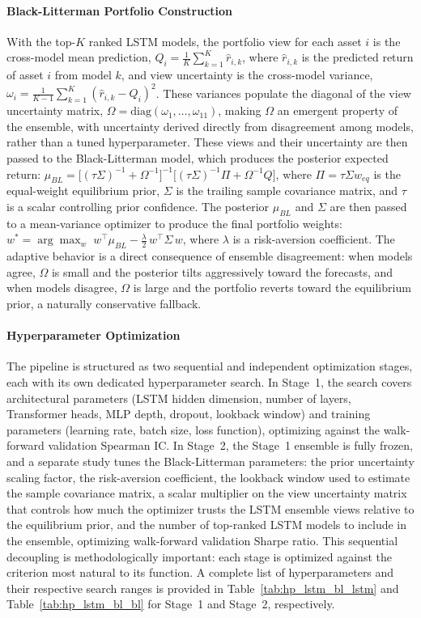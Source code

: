\paragraph{Black-Litterman Portfolio Construction} With the top-$K$ ranked LSTM models, the portfolio view for each asset $i$ is the cross-model mean prediction, $Q_i = \frac{1}{K}\sum_{k=1}^{K}\hat{r}_{i,k}$, where $\hat{r}_{i,k}$ is the predicted return of asset $i$ from model $k$, and view uncertainty is the cross-model variance, $\omega_i = \frac{1}{K-1}\sum_{k=1}^{K}(\hat{r}_{i,k} - Q_i)^2$. These variances populate the diagonal of the view uncertainty matrix, $\Omega = \mathrm{diag}(\omega_1,\dots,\omega_{11})$, making $\Omega$ an emergent property of the ensemble, with uncertainty derived directly from disagreement among models, rather than a tuned hyperparameter. These views and their uncertainty are then passed to the Black-Litterman model, which produces the posterior expected return: $\mu_{BL} = \bigl[(\tau\Sigma)^{-1} + \Omega^{-1}\bigr]^{-1}\bigl[(\tau\Sigma)^{-1}\Pi + \Omega^{-1}Q\bigr]$, where $\Pi = \tau\Sigma w_{eq}$ is the equal-weight equilibrium prior, $\Sigma$ is the trailing sample covariance matrix, and $\tau$ is a scalar controlling prior confidence. The posterior $\mu_{BL}$ and $\Sigma$ are then passed to a mean-variance optimizer to produce the final portfolio weights: $w^{*} = \arg\max_{w}\;w^\top\mu_{BL} - \tfrac{\lambda}{2}\,w^\top\Sigma\,w$, where $\lambda$ is a risk-aversion coefficient. The adaptive behavior is a direct consequence of ensemble disagreement: when models agree, $\Omega$ is small and the posterior tilts aggressively toward the forecasts, and when models disagree, $\Omega$ is large and the portfolio reverts toward the equilibrium prior, a naturally conservative fallback.

\paragraph{Hyperparameter Optimization} The pipeline is structured as two sequential and independent optimization stages, each with its own dedicated hyperparameter search. In Stage~1, the search covers architectural parameters (LSTM hidden dimension, number of layers, Transformer heads, MLP depth, dropout, lookback window) and training parameters (learning rate, batch size, loss function), optimizing against the walk-forward validation Spearman IC. In Stage~2, the Stage~1 ensemble is fully frozen, and a separate study tunes the Black-Litterman parameters: the prior uncertainty scaling factor, the risk-aversion coefficient, the lookback window used to estimate the sample covariance matrix, a scalar multiplier on the view uncertainty matrix that controls how much the optimizer trusts the LSTM ensemble views relative to the equilibrium prior, and the number of top-ranked LSTM models to include in the ensemble, optimizing walk-forward validation Sharpe ratio. This sequential decoupling is methodologically important: each stage is optimized against the criterion most natural to its function. A complete list of hyperparameters and their respective search ranges is provided in Table~\ref{tab:hp_lstm_bl_lstm} and Table~\ref{tab:hp_lstm_bl_bl} for Stage~1 and Stage~2, respectively.


